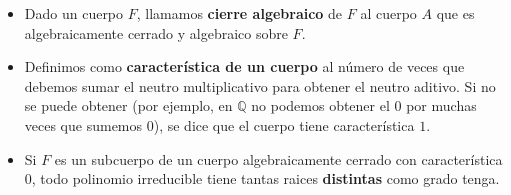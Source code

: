 \begin{itemize}
\item Dado un cuerpo $F$, llamamos \textbf{cierre algebraico} de $F$ al cuerpo $A$ que es algebraicamente cerrado y algebraico sobre $F$.

\item Definimos como \textbf{característica de un cuerpo} al número de veces que debemos sumar el neutro multiplicativo para obtener el neutro aditivo. Si no se puede obtener (por ejemplo, en $ℚ$ no podemos obtener el $0$ por muchas veces que sumemos $0$), se dice que el cuerpo tiene característica $1$.

\item Si $F$ es un subcuerpo de un cuerpo algebraicamente cerrado con característica 0, todo polinomio irreducible tiene tantas raices \textbf{distintas} como grado tenga.

\end{itemize}

